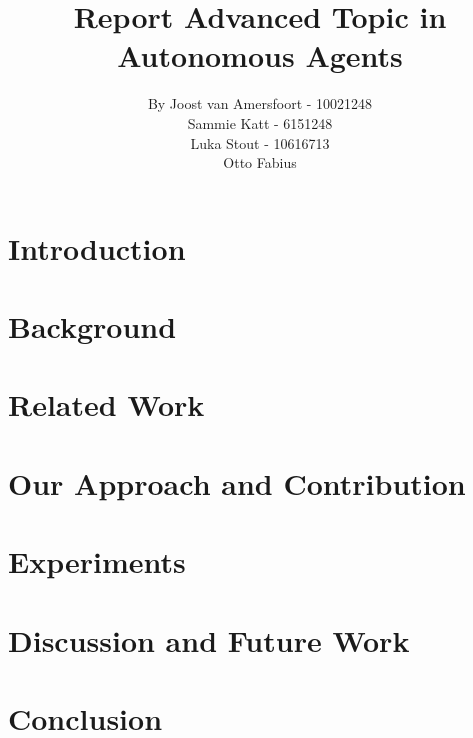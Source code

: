 \documentclass{article}
\begin{document}
\title{Report Advanced Topic in Autonomous Agents}
\author{By Joost van Amersfoort - 10021248 \\ Sammie Katt - 6151248 \\ Luka Stout - 10616713 \\ Otto Fabius}
\maketitle

\section{Introduction}

\section{Background}

\section{Related Work}

\section{Our Approach and Contribution}

\section{Experiments}

\section{Discussion and Future Work}

\section{Conclusion}
\end{document}
